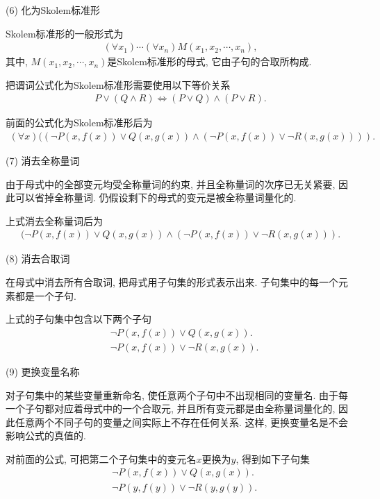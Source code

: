 (6) 化为Skolem标准形

Skolem标准形的一般形式为
\begin{align}
  (\forall x_1)\cdots(\forall x_n) M(x_1,x_2,\cdots,x_n),
\end{align}
其中, $M(x_1,x_2,\cdots,x_n)$是Skolem标准形的母式, 它由子句的合取所构成.

把谓词公式化为Skolem标准形需要使用以下等价关系
\begin{align}
  P\vee (Q\wedge R) \Leftrightarrow  (P\vee Q)\wedge (P\vee R).
\end{align}
\begin{example}
前面的公式化为Skolem标准形后为
\begin{align}
  (\forall x)((\neg P(x,f(x))\vee Q(x,g(x))\wedge (\neg P(x,f(x))\vee \neg R(x,g(x)))).
\end{align}
\end{example}

(7) 消去全称量词

由于母式中的全部变元均受全称量词的约束, 并且全称量词的次序已无关紧要, 因此可以省掉全称量词. 仍假设剩下的母式的变元是被全称量词量化的.
\begin{example}
上式消去全称量词后为
\begin{align}
  (\neg P(x,f(x))\vee Q(x,g(x)) \wedge (\neg P(x,f(x))\vee \neg R(x,g(x))).
\end{align}
\end{example}

(8) 消去合取词

在母式中消去所有合取词, 把母式用子句集的形式表示出来. 子句集中的每一个元素都是一个子句.
\begin{example}
上式的子句集中包含以下两个子句
\begin{align}
  &\neg P(x,f(x))\vee Q(x,g(x)).\\
  &\neg P(x,f(x))\vee \neg R(x,g(x)).
\end{align}
\end{example}

(9) 更换变量名称

对子句集中的某些变量重新命名, 使任意两个子句中不出现相同的变量名. 由于每一个子句都对应着母式中的一个合取元, 并且所有变元都是由全称量词量化的, 因此任意两个不同子句的变量之间实际上不存在任何关系. 这样, 更换变量名是不会影响公式的真值的.
\begin{example}
对前面的公式, 可把第二个子句集中的变元名$x$更换为$y$, 得到如下子句集
\begin{align}
  &\neg P(x,f(x))\vee Q(x,g(x)).\\
  &\neg P(y,f(y))\vee \neg R(y,g(y)).
\end{align}
\end{example}
